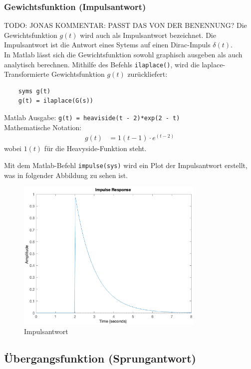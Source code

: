\subsubsection{Gewichtsfunktion (Impulsantwort)}
TODO: JONAS KOMMENTAR: PASST DAS VON DER BENENNUNG?
Die Gewichtsfunktion $g(t)$ wird auch als Impulsantwort bezeichnet.
Die Impulsantwort ist die Antwort eines Sytems auf einen Dirac-Impuls $\delta(t)$.\\
In Matlab lässt sich die Gewichtsfunktion sowohl graphisch ausgeben als auch analytisch berechnen.
Mithilfe des Befehls \texttt{ilaplace()}, wird die laplace-Transformierte  Gewichtsfunktion $g(t)$ zurückliefert:
\begin{verbatim}
    syms g(t)
    g(t) = ilaplace(G(s))
\end{verbatim}

Matlab Ausgabe: \texttt{g(t) = heaviside(t - 2)*exp(2 - t)}\\
Mathematische Notation: 
\begin{align*}
    g(t) &=1(t-1)\cdot e^{(t-2)}
\end{align*} wobei $1(t)$ für die Heavyside-Funktion steht.

Mit dem Matlab-Befehl \texttt{impulse(sys)} wird ein Plot der Impulsantwort erstellt, was in folgender Abbildung zu sehen ist. 

\begin{figure}[H]
    \label{fig:impuls}
    \centering
    \includegraphics[width=0.8\textwidth]{Bilder/ImpulsAntwortPT1Tt.eps}
    \caption{Impulsantwort}
 \end{figure}

\subsection{Übergangsfunktion (Sprungantwort)}

